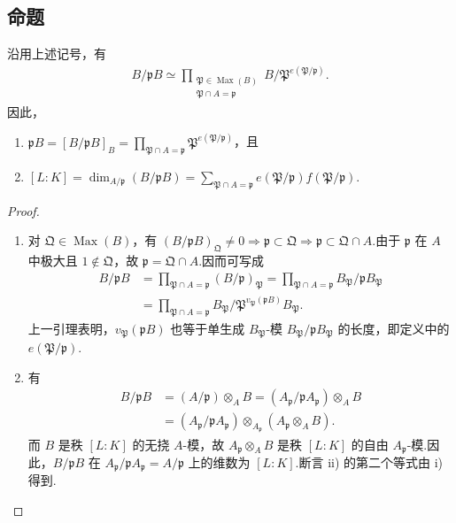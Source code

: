 \subsection{命题}\label{sec:nt-3-4-1}
\begin{proposition*}
沿用上述记号，有
\begin{align*}
B/\mathfrak pB\simeq\prod_{\substack{\mathfrak P\in\operatorname{Max}(B)\\\mathfrak P\cap A=\mathfrak p}}B/\mathfrak P^{e(\mathfrak P/\mathfrak p)}.
\end{align*}
因此，
\begin{enumerate}[label=\roman*)]
\item $\mathfrak pB=[B/\mathfrak pB]_B=\prod_{\mathfrak P\cap A=\mathfrak p}\mathfrak P^{e(\mathfrak P/\mathfrak p)}$，且
\item $[L:K]=\dim_{A/\mathfrak p}(B/\mathfrak pB)=\sum_{\mathfrak P\cap A=\mathfrak p}e(\mathfrak P/\mathfrak p)f(\mathfrak P/\mathfrak p)$.
\end{enumerate}
\end{proposition*}
\begin{proof}
\begin{enumerate}[label=\roman*)]
\item 对 $\mathfrak Q\in\operatorname{Max}(B)$，有 $(B/\mathfrak pB)_{\mathfrak Q}\ne0\Rightarrow\mathfrak p\subset\mathfrak Q\Rightarrow\mathfrak p\subset\mathfrak Q\cap A$.由于 $\mathfrak p$ 在 $A$ 中极大且 $1\notin\mathfrak Q$，故 $\mathfrak p=\mathfrak Q\cap A$.因而可写成
\begin{align*}
B/\mathfrak pB
&=\prod_{\mathfrak P\cap A=\mathfrak p}(B/\mathfrak p)_{\mathfrak P}
=\prod_{\mathfrak P\cap A=\mathfrak p}B_{\mathfrak P}/\mathfrak pB_{\mathfrak P}\\
&=\prod_{\mathfrak P\cap A=\mathfrak p}B_{\mathfrak P}/\mathfrak P^{v_{\mathfrak P}(\mathfrak pB)}B_{\mathfrak P}.
\end{align*}
上一引理表明，$v_{\mathfrak P}(\mathfrak pB)$ 也等于单生成 $B_{\mathfrak P}$-模 $B_{\mathfrak P}/\mathfrak pB_{\mathfrak P}$ 的长度，即定义中的 $e(\mathfrak P/\mathfrak p)$.
\item 有
\begin{align*}
B/\mathfrak pB
&=(A/\mathfrak p)\otimes_AB
=(A_{\mathfrak p}/\mathfrak pA_{\mathfrak p})\otimes_AB\\
&=(A_{\mathfrak p}/\mathfrak pA_{\mathfrak p})\otimes_{A_{\mathfrak p}}(A_{\mathfrak p}\otimes_AB).
\end{align*}
而 $B$ 是秩 $[L:K]$ 的无挠 $A$-模，故 $A_{\mathfrak p}\otimes_AB$ 是秩 $[L:K]$ 的自由 $A_{\mathfrak p}$-模.因此，$B/\mathfrak pB$ 在 $A_{\mathfrak p}/\mathfrak pA_{\mathfrak p}=A/\mathfrak p$ 上的维数为 $[L:K]$.断言 ii) 的第二个等式由 i) 得到.
\end{enumerate}
\end{proof}
